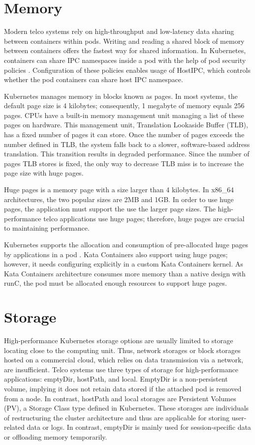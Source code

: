\section{Memory}

Modern telco systems rely on high-throughput and low-latency data sharing between containers within pods. Writing and reading a shared block of memory between containers offers the fastest way for shared information. In Kubernetes, containers can share IPC namespaces inside a pod with the help of pod security policies \cite{PodSecurityPolicyKubernetes}. Configuration of these policies enables usage of HostIPC, which controls whether the pod containers can share host IPC namespace.

Kubernetes manages memory in blocks known as pages. In most systems, the default page size is 4 kilobytes; consequently, 1 megabyte of memory equals 256 pages. CPUs have a built-in memory management unit managing a list of these pages on hardware. This management unit, Translation Lookaside Buffer (TLB), has a fixed number of pages it can store. Once the number of pages exceeds the number defined in TLB, the system falls back to a slower, software-based address translation. This transition results in degraded performance. Since the number of pages TLB stores is fixed, the only way to decrease TLB miss is to increase the page size with huge pages. \cite{HugePagesOpenShift}

Huge pages is a memory page with a size larger than 4 kilobytes. In x86\_64 architectures, the two popular sizes are 2MB and 1GB. In order to use huge pages, the application must support the use the larger page sizes. The high-performance telco applications use huge pages; therefore, huge pages are crucial to maintaining performance.

Kubernetes supports the allocation and consumption of pre-allocated huge pages by applications in a pod \cite{HugePagesKubernetes}. Kata Containers also support using huge pages; however, it needs configuring explicitly in a custom Kata Containers kernel. As Kata Containers architecture consumes more memory than a native design with runC, the pod must be allocated enough resources to support huge pages.

\section{Storage}

High-performance Kubernetes storage options are usually limited to storage locating close to the computing unit. Thus, network storages or block storages hosted on a commercial cloud, which relies on data transmission via a network, are insufficient. Telco systems use three types of storage for high-performance applications: emptyDir, hostPath, and local. EmptyDir is a non-persistent volume, implying it does not retain data stored if the attached pod is removed from a node. In contrast, hostPath and local storages are Persistent Volumes (PV), a Storage Class type defined in Kubernetes. These storages are individuals of restructuring the cluster architecture and thus are applicable for storing user-related data or logs. In contrast, emptyDir is mainly used for session-specific data or offloading memory temporarily.


